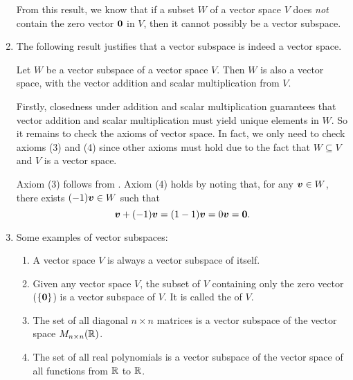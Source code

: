 \begin{enumerate}
From this result, we know that if a subset \(W\) of a vector space \(V\) does
\emph{not} contain the zero vector \(\vb*{0}\) in \(V\), then it cannot
possibly be a vector subspace.

\item The following result justifies that a vector subspace is indeed a vector
space.
\begin{proposition}
\label{prp:vec-subsp-is-vec-sp}
Let \(W\) be a vector subspace of a vector space \(V\). Then \(W\) is also a
vector space, with the vector addition and scalar multiplication from \(V\).
\end{proposition}
\begin{pf}
Firstly, closedness under addition and scalar multiplication guarantees that
vector addition and scalar multiplication must yield unique elements in \(W\).
So it remains to check the axioms of vector space. In fact, we only need to
check axioms (3) and (4) since other axioms must hold due to the fact that
\(W\subseteq V\) and \(V\) is a vector space.

Axiom (3) follows from . Axiom (4) holds by
noting that, for any \(\vb*{v}\in W\), there exists \((-1)\vb*{v}\in W\) such
that
\[
\vb*{v}+(-1)\vb*{v}=(1-1)\vb*{v}=0\vb*{v}=\vb*{0}.
\]
\end{pf}
\item Some examples of vector subspaces:
\begin{enumerate}
\item A vector space \(V\) is always a vector subspace of itself.
\item Given any vector space \(V\), the subset of \(V\) containing only the
zero vector (\(\{\vb*{0}\}\)) is a vector subspace of \(V\). It is
called the  of \(V\).
\item The set of all diagonal \(n\times n\) matrices is a vector subspace of the
vector space \(M_{n\times n}(\mathbb{R})\).
\item The set of all real polynomials is a vector subspace of the vector
space of all functions from \(\mathbb{R}\) to \(\mathbb{R}\).
\end{enumerate}
\end{enumerate}
